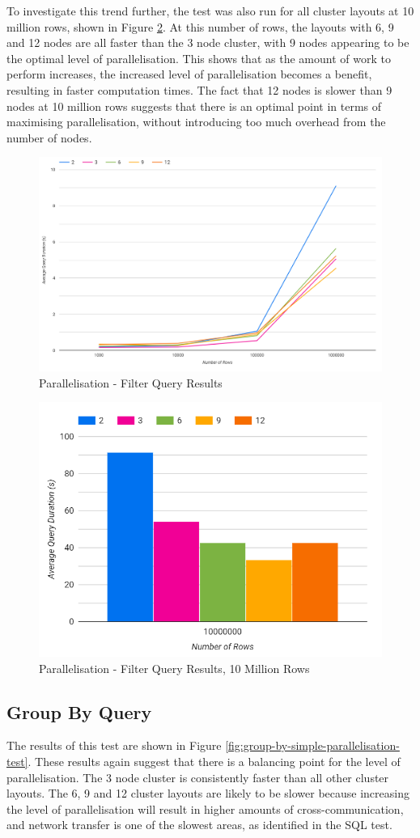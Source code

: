 To investigate this trend further, the test was also run for all cluster layouts at 10 million rows, shown in Figure \ref{fig:filter-simple-parallelisation-10m}. At this number of rows, the layouts with 6, 9 and 12 nodes are all faster than the 3 node cluster, with 9 nodes appearing to be the optimal level of parallelisation. This shows that as the amount of work to perform increases, the increased level of parallelisation becomes a benefit, resulting in faster computation times. The fact that 12 nodes is slower than 9 nodes at 10 million rows suggests that there is an optimal point in terms of maximising parallelisation, without introducing too much overhead from the number of nodes.

\begin{figure}[h]
	\centering
	\includegraphics[width=0.8\linewidth]{chapters/diagrams/testing/filter-simple-parallelisation-test}
	\caption{Parallelisation - Filter Query Results}
	\label{fig:filter-simple-parallelisation-test}
\end{figure}

\begin{figure}[h]
	\centering
	\includegraphics[width=0.4\linewidth]{chapters/diagrams/testing/filter-simple-parallelisation-10m}
	\caption{Parallelisation - Filter Query Results, 10 Million Rows}
	\label{fig:filter-simple-parallelisation-10m}
\end{figure}

\subsection{Group By Query}
The results of this test are shown in Figure \ref{fig:group-by-simple-parallelisation-test}. These results again suggest that there is a balancing point for the level of parallelisation. The 3 node cluster is consistently faster than all other cluster layouts. The 6, 9 and 12 cluster layouts are likely to be slower because increasing the level of parallelisation will result in higher amounts of cross-communication, and network transfer is one of the slowest areas, as identified in the SQL test.

